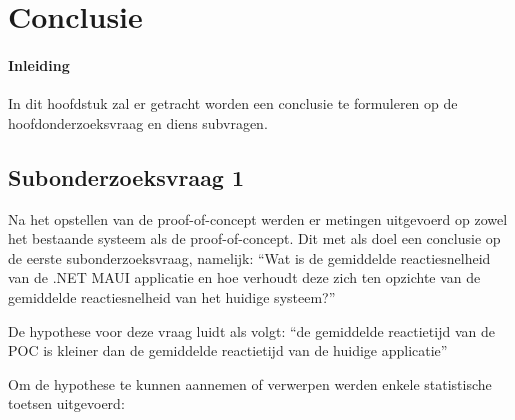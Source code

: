 
\chapter{Conclusie}%
\label{ch:conclusie}

\subsubsection{Inleiding}
In dit hoofdstuk zal er getracht worden een conclusie te formuleren op de hoofdonderzoeksvraag en diens subvragen.

\section{Subonderzoeksvraag 1}
Na het opstellen van de proof-of-concept werden er metingen uitgevoerd op zowel het bestaande systeem als de proof-of-concept. Dit met als doel een conclusie op de eerste subonderzoeksvraag, namelijk: ``Wat is de gemiddelde reactiesnelheid van de .NET MAUI applicatie en hoe verhoudt deze zich ten opzichte van de gemiddelde reactiesnelheid van het huidige systeem?''

De hypothese voor deze vraag luidt als volgt: ``de gemiddelde reactietijd van de POC is kleiner dan de gemiddelde reactietijd van de huidige applicatie''

Om de hypothese te kunnen aannemen of verwerpen werden enkele statistische toetsen uitgevoerd:

